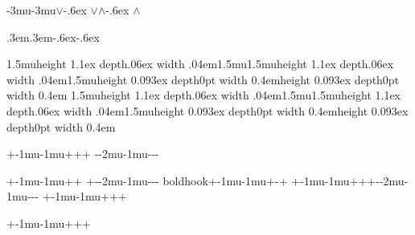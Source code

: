 \def\rtvvee{\gg\mkern-3mu}%
\def\ltvvee{\mkern-3mu\ll}%
\def\dtvvee{\vbox{\hbox{$\vee$}\kern-.6ex \hbox{$\vee$}\vss}}%
\def\utvvee{\vbox{\vss\hbox{$\wedge$}\kern-.6ex \hbox{$\wedge$}\kern\z@}}%
\rtvvee\ltvvee\dtvvee\utvvee

\def\ltlala{\ltla\kern.3em\ltla}%
\def\rtlala{\rtla\kern.3em\rtla}%
\def\utlala{\hbox{\utla\raise-.6ex\utla}}%
\def\dtlala{\hbox{\dtla\lower-.6ex\dtla}}%
\rtlala\ltlala\dtlala\utlala

\def\utbar{\vrule height 0.093ex depth0pt width 0.4em}%
\let\dtbar\utbar%
\def\rtbar{\mkern1.5mu\vrule height 1.1ex depth.06ex width .04em\mkern1.5mu}%
\let\ltbar\rtbar%
\rtbar\ltbar\dtbar\utbar%
\newarrowtail{|}\rtbar\ltbar\dtbar\utbar%


\def\rthooka{\raisehook{}+\subset\mkern-1mu}%
\def\lthooka{\mkern-1mu\raisehook{}+\supset}%
\def\rthookb{\raisehook{}-\subset\mkern-2mu}%
\def\lthookb{\mkern-1mu\raisehook{}-\supset}%

\def\dthooka{\shifthook{}+\cap}%
\def\dthookb{\shifthook{}-\cap}%
\def\uthooka{\shifthook{}+\cup}%
\def\uthookb{\shifthook{}-\cup}%

\rthooka\lthooka\dthooka\uthooka{}%
\rthookb\lthookb\dthookb\uthookb

\ifx\boldmath\undefined{}\rthooka\lthooka\dthooka
\uthooka{}\rthookb\lthookb\dthookb\uthookb\newarrowtail
{boldhook}\rthooka\lthooka\dthookb\uthooka\else\def\rtbhooka{\raisehook
\boldmath+\subset\mkern-1mu}%
\def\ltbhooka{\mkern-1mu\raisehook\boldmath+\supset}%
\def\rtbhookb{\raisehook\boldmath-\subset\mkern-2mu}%
\def\ltbhookb{\mkern-1mu\raisehook\boldmath-\supset}%
\def\dtbhooka{\shifthook\boldmath+\cap}%
\def\dtbhookb{\shifthook\boldmath-\cap}%
\def\utbhooka{\shifthook\boldmath+\cup}%
\def\utbhookb{\shifthook\boldmath-\cup}%
\rtbhooka\ltbhooka\dtbhooka\utbhooka{}\rtbhookb\ltbhookb\dtbhookb\utbhookb{}%
\rtbhooka\ltbhooka\dtbhooka\utbhooka\fi

\def\dtsqhooka{\shifthook{}+\sqcap}%
\def\dtsqhookb{\shifthook{}-\sqcap}%
\def\ltsqhooka{\mkern-1mu\raisehook{}+\sqsupset}%
\def\ltsqhookb{\mkern-1mu\raisehook{}-\sqsupset}%
\def\rtsqhooka{\raisehook{}+\sqsubset\mkern-1mu}%
\def\rtsqhookb{\raisehook{}-\sqsubset\mkern-2mu}%
\def\utsqhooka{\shifthook{}+\sqcup}%
\def\utsqhookb{\shifthook{}-\sqcup}%
\rtsqhooka\ltsqhooka\dtsqhooka\utsqhooka

